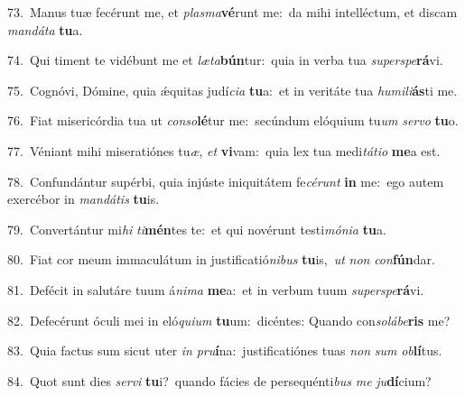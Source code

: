 {\numbfont\textcolor{\numbcolor}{73.}}~Manus tuæ fecérunt me, et \textit{plas}\-\textit{ma}\textbf{vé}runt me:~\star da mihi intelléctum, et discam \textit{man}\-\textit{dá}\textit{ta} \textbf{tu}\-a.\par
{\numbfont\textcolor{\numbcolor}{74.}}~Qui timent te vidébunt me et \textit{læ}\-\textit{ta}\textbf{bún}tur:~\star quia in verba tua \textit{su}\-\textit{per}\textit{spe}\textbf{rá}vi.\par
{\numbfont\textcolor{\numbcolor}{75.}}~Cognóvi, Dómine, quia ǽquitas judí\-\textit{ci}\-\textit{a} \textbf{tu}\-a:~\star et in veritáte tua \textit{hu}\-\textit{mi}\textit{li}\textbf{ás}ti me.\par
{\numbfont\textcolor{\numbcolor}{76.}}~Fiat misericórdia tua ut \textit{con}\-\textit{so}\textbf{lé}tur me:~\star secúndum elóquium tu\textit{um} \textit{ser}\-\textit{vo} \textbf{tu}\-o.\par
{\numbfont\textcolor{\numbcolor}{77.}}~Véniant mihi miseratiónes tu\-\textit{æ}\-, \textit{et} \textbf{vi}\-vam:~\star quia lex tua medi\-\textit{tá}\-\textit{ti}\textit{o} \textbf{me}\-a est.\par
{\numbfont\textcolor{\numbcolor}{78.}}~Confundántur supérbi, quia injúste iniquitátem fe\-\textit{cé}\-\textit{runt} \textbf{in} me:~\star ego autem exercébor in \textit{man}\-\textit{dá}\textit{tis} \textbf{tu}\-is.\par
{\numbfont\textcolor{\numbcolor}{79.}}~Convertántur mi\textit{hi} \textit{ti}\-\textbf{mén}tes te:~\star et qui novérunt testi\-\textit{mó}\-\textit{ni}\textit{a} \textbf{tu}\-a.\par
{\numbfont\textcolor{\numbcolor}{80.}}~Fiat cor meum immaculátum in justificatió\-\textit{ni}\-\textit{bus} \textbf{tu}\-is,~\star \textit{ut} \textit{non} \textit{con}\-\textbf{fún}dar.\par
{\numbfont\textcolor{\numbcolor}{81.}}~Defécit in salutáre tuum á\-\textit{ni}\-\textit{ma} \textbf{me}\-a:~\star et in verbum tuum \textit{su}\-\textit{per}\textit{spe}\textbf{rá}vi.\par
{\numbfont\textcolor{\numbcolor}{82.}}~Defecérunt óculi mei in eló\-\textit{qui}\-\textit{um} \textbf{tu}\-um:~\star dicéntes: Quando con\-\textit{so}\-\textit{lá}\textit{be}\textbf{ris} me?\par
{\numbfont\textcolor{\numbcolor}{83.}}~Quia factus sum sicut uter \textit{in} \textit{pru}\-\textbf{í}na:~\star justificatiónes tuas \textit{non} \textit{sum} \textit{ob}\-\textbf{lí}tus.\par
{\numbfont\textcolor{\numbcolor}{84.}}~Quot sunt dies \textit{ser}\-\textit{vi} \textbf{tu}\-i?~\star quando fácies de persequénti\textit{bus} \textit{me} \textit{ju}\-\textbf{dí}cium?\par
